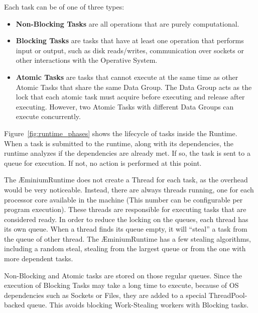 \documentclass[smallextended]{svjour3}
\begin{document}

Each task can be of one of three types:

\begin{itemize}
	\item \textbf{Non-Blocking Tasks} are all operations that are purely computational.
	\item \textbf{Blocking Tasks} are tasks that have at least one operation that performs input or output, such as disk reads/writes, communication over sockets or other interactions with the Operative System.
	\item \textbf{Atomic Tasks} are tasks that cannot execute at the same time as other Atomic Tasks that share the same Data Group. The Data Group acts as the lock that each atomic task must acquire before executing and release after executing. However, two Atomic Tasks with different Data Groups can execute concurrently.
\end{itemize}

Figure~\ref{fig:runtime_phases} shows the lifecycle of tasks inside the Runtime. When a task is submitted to the runtime, along with its dependencies, the runtime analyzes if the dependencies are already met. If so, the task is sent to a queue for execution. If not, no action is performed at this point.


The ÆminiumRuntime does not create a Thread for each task, as the overhead would be very noticeable. Instead, there are always  threads running, one for each processor core available in the machine (This number can be configurable per program execution). These threads are responsible for executing tasks that are considered ready. In order to reduce the locking on the queues, each thread has its own queue. When a thread finds its queue empty, it will ``steal'' a task from the queue of other thread. The ÆminiumRuntime has a few stealing algorithms, including a random steal, stealing from the largest queue or from the one with more dependent tasks.

Non-Blocking and Atomic tasks are stored on those regular queues. Since the execution of Blocking Tasks may take a long time to execute, because of OS dependencies such as Sockets or Files, they are added to a special ThreadPool-backed queue. This avoids blocking Work-Stealing workers with Blocking tasks.
\end{document}
